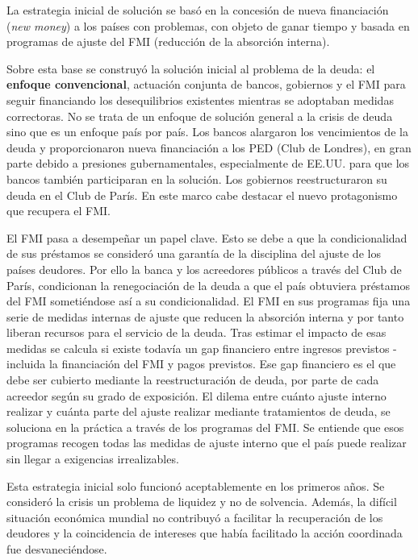 \documentclass[10pt,a4paper]{article}
\begin{document}
La estrategia inicial de solución se basó en la concesión de nueva financiación (\textit{new money}) a los países con problemas, con objeto de ganar tiempo y basada en programas de ajuste del FMI (reducción de la absorción interna).

Sobre esta base se construyó la solución inicial al problema de la deuda: el \textbf{enfoque convencional}, actuación conjunta de bancos, gobiernos y el FMI para seguir financiando los desequilibrios existentes mientras se adoptaban medidas correctoras. No se trata de un enfoque de solución general a la crisis de deuda sino que es un enfoque país por país. Los bancos alargaron los vencimientos de la deuda y proporcionaron nueva financiación a los PED (Club de Londres), en gran parte debido a presiones gubernamentales, especialmente de EE.UU. para que los bancos también participaran en la solución. Los gobiernos reestructuraron su deuda en el Club de París. En este marco cabe destacar el nuevo protagonismo que recupera el FMI.

El FMI pasa a desempeñar un papel clave. Esto se debe a que la condicionalidad de sus préstamos se consideró una garantía de la disciplina del ajuste de los países deudores. Por ello la banca y los acreedores públicos a través del Club de París, condicionan la renegociación de la deuda a que el país obtuviera préstamos del FMI sometiéndose así a su condicionalidad. El FMI en sus programas fija una serie de medidas internas de ajuste que reducen la absorción interna y por tanto liberan recursos para el servicio de la deuda. Tras estimar el impacto de esas medidas se calcula si existe todavía un gap financiero entre ingresos previstos -incluida la financiación del FMI y pagos previstos. Ese gap financiero es el que debe ser cubierto mediante la reestructuración de deuda, por parte de cada acreedor según su grado de exposición. El dilema entre cuánto ajuste interno realizar y cuánta parte del ajuste realizar mediante tratamientos de deuda, se soluciona en la práctica a través de los programas del FMI. Se entiende que esos programas recogen todas las medidas de ajuste interno que el país puede realizar sin llegar a exigencias irrealizables.

Esta estrategia inicial solo funcionó aceptablemente en los primeros años. Se consideró la crisis un problema de liquidez y no de solvencia. Además, la difícil situación económica mundial no contribuyó a facilitar la recuperación de los deudores y la coincidencia de intereses que había facilitado la acción coordinada fue desvaneciéndose.
\end{document}
